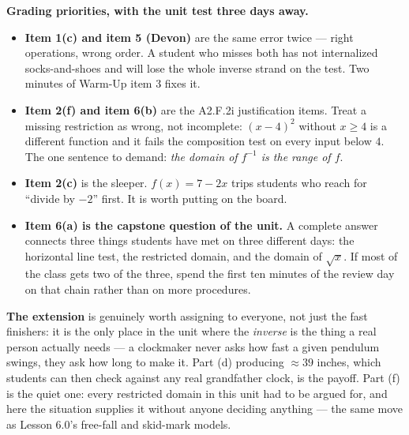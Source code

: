 \documentclass[10pt]{article}
\begin{document}
\begin{teachernote}
\small \textbf{Grading priorities, with the unit test three days away.}
\begin{itemize}[leftmargin=1.3em, nosep]
  \item \textbf{Item 1(c) and item 5 (Devon)} are the same error twice --- right operations, wrong
        order. A student who misses both has not internalized socks-and-shoes and will lose the
        whole inverse strand on the test. Two minutes of Warm-Up item 3 fixes it.
  \item \textbf{Item 2(f) and item 6(b)} are the A2.F.2i justification items. Treat a missing
        restriction as wrong, not incomplete: $(x-4)^{2}$ without $x\ge4$ is a different function
        and it fails the composition test on every input below $4$. The one sentence to demand:
        \emph{the domain of $f^{-1}$ is the range of $f$}.
  \item \textbf{Item 2(c)} is the sleeper. $f(x)=7-2x$ trips students who reach for ``divide by
        $-2$'' first. It is worth putting on the board.
  \item \textbf{Item 6(a) is the capstone question of the unit.} A complete answer connects three
        things students have met on three different days: the horizontal line test, the restricted
        domain, and the domain of $\sqrt{x}$. If most of the class gets two of the three, spend the
        first ten minutes of the review day on that chain rather than on more procedures.
  \end{itemize}
\textbf{The extension} is genuinely worth assigning to everyone, not just the fast finishers: it is
the only place in the unit where the \emph{inverse} is the thing a real person actually needs --- a
clockmaker never asks how fast a given pendulum swings, they ask how long to make it. Part (d)
producing $\approx39$ inches, which students can then check against any real grandfather clock, is
the payoff. Part (f) is the quiet one: every restricted domain in this unit had to be argued for,
and here the situation supplies it without anyone deciding anything --- the same move as Lesson
6.0's free-fall and skid-mark models.
\end{teachernote}
\end{document}

